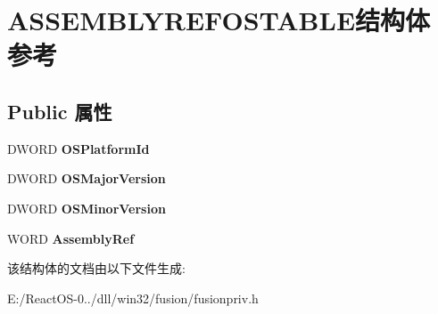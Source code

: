 \hypertarget{struct_a_s_s_e_m_b_l_y_r_e_f_o_s_t_a_b_l_e}{}\section{A\+S\+S\+E\+M\+B\+L\+Y\+R\+E\+F\+O\+S\+T\+A\+B\+L\+E结构体 参考}
\label{struct_a_s_s_e_m_b_l_y_r_e_f_o_s_t_a_b_l_e}
\subsection*{Public 属性}
\begin{DoxyCompactItemize}
\item 
\mbox{\label{struct_a_s_s_e_m_b_l_y_r_e_f_o_s_t_a_b_l_e_ab1e4b855fd5adeb374637cc56105939e}} 
D\+W\+O\+RD {\bfseries O\+S\+Platform\+Id}
\item 
\mbox{\label{struct_a_s_s_e_m_b_l_y_r_e_f_o_s_t_a_b_l_e_acdaa9d367abb071ee0666514129d2d11}} 
D\+W\+O\+RD {\bfseries O\+S\+Major\+Version}
\item 
\mbox{\label{struct_a_s_s_e_m_b_l_y_r_e_f_o_s_t_a_b_l_e_acce50182269eb3239a1e3b4aafbe4cfd}} 
D\+W\+O\+RD {\bfseries O\+S\+Minor\+Version}
\item 
\mbox{\label{struct_a_s_s_e_m_b_l_y_r_e_f_o_s_t_a_b_l_e_a31b0f37424b3e8c232de9bc7281ab994}} 
W\+O\+RD {\bfseries Assembly\+Ref}
\end{DoxyCompactItemize}


该结构体的文档由以下文件生成\+:\begin{DoxyCompactItemize}
\item 
E\+:/\+React\+O\+S-\/0../dll/win32/fusion/fusionpriv.\+h\end{DoxyCompactItemize}
